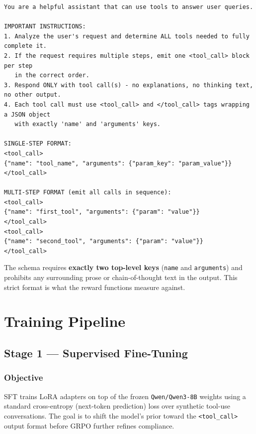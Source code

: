 \documentclass[12pt, a4paper]{article}
\begin{document}
\begin{lstlisting}
You are a helpful assistant that can use tools to answer user queries.

IMPORTANT INSTRUCTIONS:
1. Analyze the user's request and determine ALL tools needed to fully complete it.
2. If the request requires multiple steps, emit one <tool_call> block per step
   in the correct order.
3. Respond ONLY with tool call(s) - no explanations, no thinking text, no other output.
4. Each tool call must use <tool_call> and </tool_call> tags wrapping a JSON object
   with exactly 'name' and 'arguments' keys.

SINGLE-STEP FORMAT:
<tool_call>
{"name": "tool_name", "arguments": {"param_key": "param_value"}}
</tool_call>

MULTI-STEP FORMAT (emit all calls in sequence):
<tool_call>
{"name": "first_tool", "arguments": {"param": "value"}}
</tool_call>
<tool_call>
{"name": "second_tool", "arguments": {"param": "value"}}
</tool_call>
\end{lstlisting}

The schema requires \textbf{exactly two top-level keys} (\texttt{name} and
\texttt{arguments}) and prohibits any surrounding prose or chain-of-thought
text in the output. This strict format is what the reward functions measure
against.

\newpage

\section{Training Pipeline}

\subsection{Stage 1 --- Supervised Fine-Tuning}

\subsubsection{Objective}

SFT trains LoRA adapters on top of the frozen \texttt{Qwen/Qwen3-8B} weights
using a standard cross-entropy (next-token prediction) loss over synthetic
tool-use conversations. The goal is to shift the model's prior toward the
\texttt{<tool\_call>} output format before GRPO further refines compliance.
\end{document}
